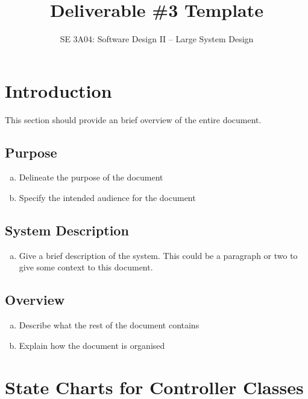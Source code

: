 \documentclass[]{article}
\title{Deliverable \#3 Template}
\author{SE 3A04: Software Design II -- Large System Design}
\date{}
\begin{document}
\maketitle	

\section{Introduction}
\label{sec:introduction}

This section should provide an brief overview of the entire document.

\subsection{Purpose}
\label{sub:purpose}
\begin{enumerate}[a)]
	\item Delineate the purpose of the document
	\item Specify the intended audience for the document
\end{enumerate}

\subsection{System Description}
\label{sub:system_description}
\begin{enumerate}[a)]
	\item Give a brief description of the system. This could be a paragraph or two to give some context to this document.
\end{enumerate}

\subsection{Overview}
\label{sub:overview}
\begin{enumerate}[a)]
	\item Describe what the rest of the document contains 
	\item Explain how the document is organised
\end{enumerate}



\section{State Charts for Controller Classes}
\label{sec:state_charts_for_controller_classes}
\end{document}
